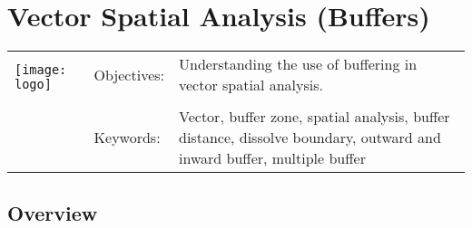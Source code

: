

\section{Vector Spatial Analysis (Buffers)}\label{sec:buffer}
\begin{tabular}{p{3.5cm}p{6cm}p{6cm}}
\multirow{2}{*}{\texttt{[image: logo]}} & Objectives: &
Understanding the use of buffering in vector spatial analysis. \\
& & \\
& Keywords: & 
Vector, buffer zone, spatial analysis, buffer distance, dissolve boundary,
outward and inward buffer, multiple buffer  \\
\hline
\end{tabular}

\subsection{Overview}\label{subsec:overview}






